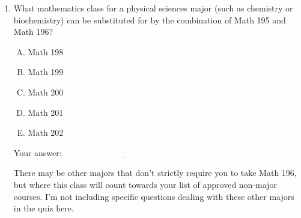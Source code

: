 \documentclass[10pt]{amsart}
\begin{document}
\begin{enumerate}
  \vspace{0.1in}
  Your answer: $\underline{\qquad\qquad\qquad\qquad\qquad\qquad\qquad}$
  \vspace{0.1in}

  {\em For budding economists}: There is another alternative available
  to you: Math with Econ specialization. This requires you to take
  more math classes than the ones listed above, but if you are
  considering it, it's better to start on the above, then decide
  whether you want to stop at the point necessary for Econ or go
  further and do Math with Econ.

\item What mathematics class for a physical sciences major (such as
  chemistry or biochemistry) can be substituted for by the combination
  of Math 195 and Math 196?

  \begin{enumerate}[(A)]
  \item Math 198
  \item Math 199
  \item Math 200
  \item Math 201
  \item Math 202
  \end{enumerate}

  \vspace{0.1in}
  Your answer: $\underline{\qquad\qquad\qquad\qquad\qquad\qquad\qquad}$
  \vspace{0.1in}

  There may be other majors that don't strictly require you to take
  Math 196, but where this class will count towards your list of
  approved non-major courses. I'm not including specific questions
  dealing with these other majors in the quiz here.
\end{enumerate}
\end{document}
